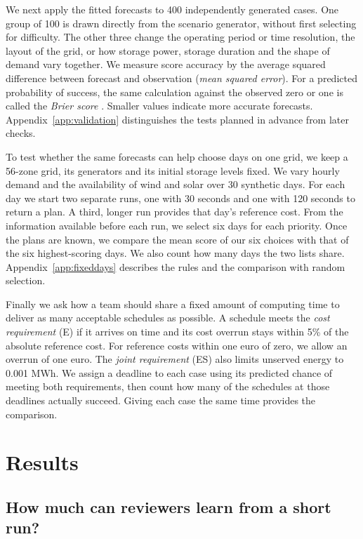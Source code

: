 \documentclass[11pt,a4paper]{article}
\begin{document}
We next apply the fitted forecasts to 400 independently generated cases. One group of 100 is drawn directly from the scenario generator, without first selecting for difficulty. The other three change the operating period or time resolution, the layout of the grid, or how storage power, storage duration and the shape of demand vary together. We measure score accuracy by the average squared difference between forecast and observation (\emph{mean squared error}). For a predicted probability of success, the same calculation against the observed zero or one is called the \emph{Brier score} \citep{gneiting2007}. Smaller values indicate more accurate forecasts. Appendix~\ref{app:validation} distinguishes the tests planned in advance from later checks.

To test whether the same forecasts can help choose days on one grid, we keep a 56-zone grid, its generators and its initial storage levels fixed. We vary hourly demand and the availability of wind and solar over 30 synthetic days. For each day we start two separate runs, one with 30 seconds and one with 120 seconds to return a plan. A third, longer run provides that day's reference cost. From the information available before each run, we select six days for each priority. Once the plans are known, we compare the mean score of our six choices with that of the six highest-scoring days. We also count how many days the two lists share. Appendix~\ref{app:fixeddays} describes the rules and the comparison with random selection.

Finally we ask how a team should share a fixed amount of computing time to deliver as many acceptable schedules as possible. A schedule meets the \emph{cost requirement} (E) if it arrives on time and its cost overrun stays within 5\% of the absolute reference cost. For reference costs within one euro of zero, we allow an overrun of one euro. The \emph{joint requirement} (ES) also limits unserved energy to 0.001 MWh. We assign a deadline to each case using its predicted chance of meeting both requirements, then count how many of the schedules at those deadlines actually succeed. Giving each case the same time provides the comparison.

\section{Results}

\subsection{How much can reviewers learn from a short run?}
\end{document}
